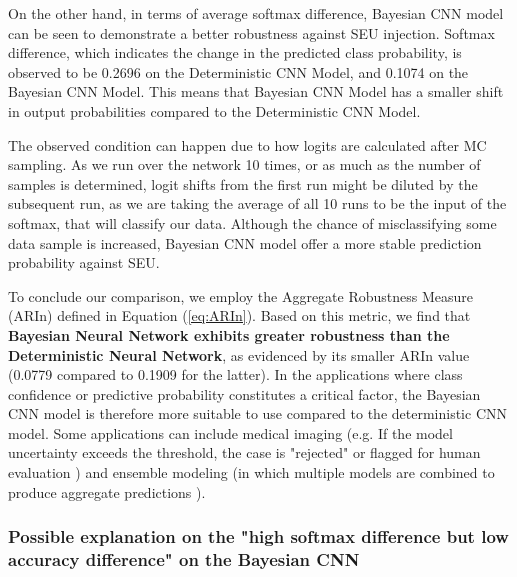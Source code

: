 \documentclass[ %
                    author={Revalda Putawara},
                supervisor={Dr. James Pope},
                    degree={MSc},
                     title={Robustness of Bayesian Neural Networks Design Choices Against Weight and Bias Perturbation Induced by Single Event Upsets (SEUs)},
                      type={},
                      year={2025}]{dissertation}
\begin{document}
On the other hand, in terms of average softmax difference, Bayesian CNN model can be seen to demonstrate a better robustness against SEU injection. Softmax difference, which indicates the change in the predicted class probability, is observed to be 0.2696 on the Deterministic CNN Model, and 0.1074 on the Bayesian CNN Model. This means that Bayesian CNN Model has a smaller shift in output probabilities compared to the Deterministic CNN Model. 

The observed condition can happen due to how logits are calculated after MC sampling. As we run over the network 10 times, or as much as the number of samples is determined, logit shifts from the first run might be diluted by the subsequent run, as we are taking the average of all 10 runs to be the input of the softmax, that will classify our data. Although the chance of misclassifying some data sample is increased, Bayesian CNN model offer a more stable prediction probability against SEU.

To conclude our comparison, we employ the Aggregate Robustness Measure (ARIn) defined in Equation (\ref{eq:ARIn}). Based on this metric, we find that \textbf{Bayesian Neural Network exhibits greater robustness than the Deterministic Neural Network}, as evidenced by its smaller ARIn value (0.0779 compared to 0.1909 for the latter). In the applications where class confidence or predictive probability constitutes a critical factor, the Bayesian CNN model is therefore more suitable to use compared to the deterministic CNN model. Some applications can include medical imaging (e.g. If the model uncertainty exceeds the threshold, the case is "rejected" or flagged for human evaluation \cite{10.3389/fninf.2024.1346723} ) and ensemble modeling (in which multiple models are combined to produce aggregate predictions \cite{bishopbarber98}). 

\subsubsection{Possible explanation on the "high softmax difference but low accuracy difference" on the Bayesian CNN}


\end{document}
